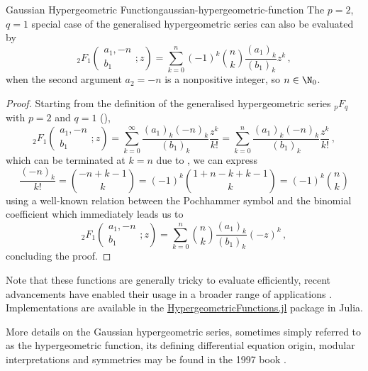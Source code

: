 \begin{lemma}{Gaussian Hypergeometric Function}{gaussian-hypergeometric-function}
  The $p=2$, $q=1$ special case of the generalised hypergeometric series can also be evaluated by
  $${}_2F_1\left(\begin{matrix}a_{1}, -n \\b_{1}\end{matrix}; z\right) = \sum_{k=0}^n (-1)^k \binom{n}{k} \frac{(a_1)_k}{(b_1)_k}z^k\,,$$
  when the second argument $a_2 = -n$ is a nonpositive integer, so $n \in \N_0$.
\end{lemma}
\begin{proof}
  Starting from the definition of the generalised hypergeometric series ${}_pF_q$ with $p=2$ and $q=1$ (),
  $${}_2F_1\left(\begin{matrix}a_{1}, -n \\b_{1}\end{matrix}; z\right) = \sum_{k=0}^{\infty} \frac{(a_1)_k (-n)_k}{(b_1)_k} \frac{z^k}{k!} = \sum_{k=0}^{n} \frac{(a_1)_k (-n)_k}{(b_1)_k} \frac{z^k}{k!}\,,$$
  which can be terminated at $k=n$ due to , we can express
  $$\frac{(-n)_k}{k!} = \binom{-n+k-1}{k} = (-1)^k \binom{1+n-k+k-1}{k} = (-1)^k \binom{n}{k}$$
  using a well-known relation between the Pochhammer symbol and the binomial coefficient which immediately leads us to  %
  $${}_2F_1\left(\begin{matrix}a_{1}, -n \\b_{1}\end{matrix}; z\right) = \sum_{k=0}^n \binom{n}{k} \frac{(a_1)_k}{(b_1)_k}(-z)^k\,,$$
  concluding the proof.
\end{proof}

Note that these functions are generally tricky to evaluate efficiently, recent advancements have enabled their usage in a broader range of applications \parencite{2008-hypergeometric-functions-jl-1,2017-hypergeometric-functions-jl-2,2023-hypergeometric-functions-jl-3}.
Implementations are available in the \href{https://github.com/JuliaMath/HypergeometricFunctions.jl}{HypergeometricFunctions.jl} package in Julia.

More details on the Gaussian hypergeometric series, sometimes simply referred to as the hypergeometric function, its defining differential equation origin, modular interpretations and symmetries may be found in the 1997 book  \parencite{1997-hypergeometric-functions-my-love}.
